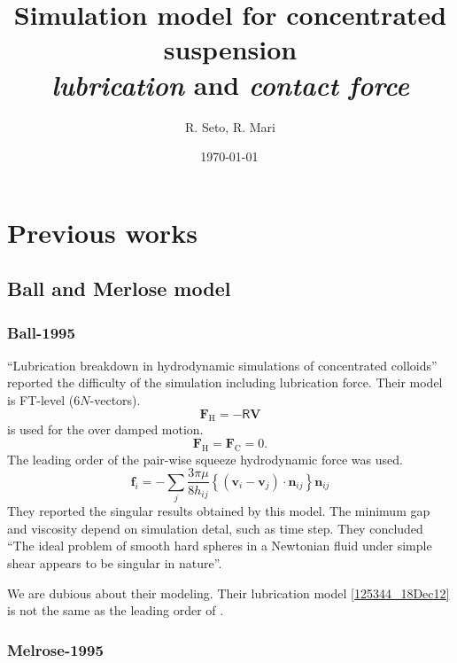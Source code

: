 \documentclass[12pt]{article}
\title{Simulation model for concentrated suspension\\
\emph{lubrication} and \emph{contact force}}
\date{\shortdate\today \, \ampmtime }
\author{R. Seto, R. Mari}
\newcommand{\tens}[1]{\bm{\mathsf{#1}}}
\begin{document}
\maketitle

\section{Previous works}
\subsection*{Ball and Merlose model}

\subsubsection*{Ball-1995}

\citet{Ball_1995} ``Lubrication breakdown in hydrodynamic simulations of concentrated colloids''
reported the difficulty of the simulation including lubrication force.
Their model is FT-level ($6N$-vectors).
\begin{equation}
 \bm{F}_{\mathrm{H}} = - \tens{R} \bm{V}
\end{equation}
is used for the over damped motion.
\begin{equation}
 \bm{F}_{\mathrm{H}} = \bm{F}_{\mathrm{C}} = 0.
\end{equation}
%
The leading order of the pair-wise squeeze hydrodynamic force
was used.
\begin{equation}
 \bm{f}_i = 
- \sum_j \frac{3 \pi \mu}{8 h_{ij}} 
\left\{
(\bm{v}_i - \bm{v}_j)\cdot \bm{n}_{ij}
\right\} \bm{n}_{ij}\label{125344_18Dec12}
\end{equation}
%
They reported the singular results obtained by this model.
%
The minimum gap and viscosity 
depend on simulation detal, such as time step.
%
They concluded
``The ideal problem of smooth hard spheres
in a Newtonian fluid under simple shear appears
to be singular in nature''.
%


We are dubious about their modeling.
%
Their lubrication model \eqref{125344_18Dec12}
is not the same as the leading order of \citet{Jeffrey_1992}.



%

\subsubsection*{Melrose-1995}
\end{document}
